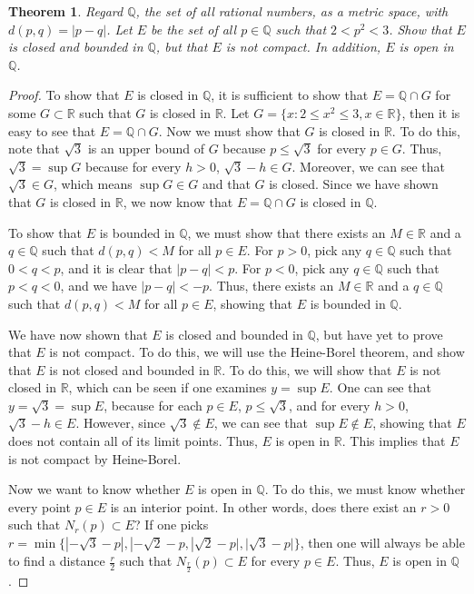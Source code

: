 \documentclass[psamsfonts]{amsart}
\newtheorem{thm}{Theorem}[section]
\theoremstyle{definition}
\theoremstyle{remark}
\numberwithin{equation}{section}
\begin{document}
\begin{thm}
Regard $\mathbb{Q}$, the set of all rational numbers, as a metric space, with $d(p,q) = |p-q|$. Let $E$ be the set of all $p \in \mathbb{Q}$ such that $2<p^2<3$. Show that $E$ is closed and bounded in $\mathbb{Q}$, but that $E$ is not compact. In addition, $E$ is open in $\mathbb{Q}$. 
\end{thm}
\begin{proof}
To show that $E$ is closed in $\mathbb{Q}$, it is sufficient to show that $E = \mathbb{Q} \cap G$ for some $G \subset \mathbb{R}$ such that $G$ is closed in $\mathbb{R}$. Let $G = \{ x : 2 \leq x^2 \leq 3, x \in \mathbb{R}\}$, then it is easy to see that $E = \mathbb{Q} \cap G$. Now we must show that $G$ is closed in $\mathbb{R}$. To do this, note that $\sqrt{3}$ is an upper bound of $G$ because $p \leq \sqrt{3}$ for every $p \in G$. Thus, $\sqrt{3} = \sup{G}$ because for every $h>0$, $\sqrt{3} - h \in G$. Moreover, we can see that $\sqrt{3} \in G$, which means $\sup{G} \in G$ and that $G$ is closed. Since we have shown that $G$ is closed in $\mathbb{R}$, we now know that $E = \mathbb{Q} \cap G$ is closed in $\mathbb{Q}$. 

To show that $E$ is bounded in $\mathbb{Q}$, we must show that there exists an $M \in \mathbb{R}$ and a $q \in \mathbb{Q}$ such that $d(p,q) < M$ for all $p \in E$. For $p>0$, pick any $q \in \mathbb{Q}$ such that $0 < q < p$, and it is clear that $|p-q| < p$. For $p<0$, pick any $q \in \mathbb{Q}$ such that $p<q<0$, and we have $|p-q| < -p$. Thus, there exists an $M \in \mathbb{R}$ and a $q \in \mathbb{Q}$ such that $d(p,q) < M$ for all $p \in E$, showing that $E$ is bounded in $\mathbb{Q}$.  

We have now shown that $E$ is closed and bounded in $\mathbb{Q}$, but have yet to prove that $E$ is not compact. To do this, we will use the Heine-Borel theorem, and show that $E$ is not closed and bounded in $\mathbb{R}$. To do this, we will show that $E$ is not closed in $\mathbb{R}$, which can be seen if one examines $y = \sup{E}$. One can see that $y = \sqrt{3} = \sup{E}$, because for each $p \in E$, $p \leq \sqrt{3}$, and for every $h>0$, $\sqrt{3} - h \in E$. However, since $\sqrt{3} \notin E$, we can see that $\sup{E} \notin E$, showing that $E$ does not contain all of its limit points. Thus, $E$ is open in $\mathbb{R}$. This implies that $E$ is not compact by Heine-Borel.

Now we want to know whether $E$ is open in $\mathbb{Q}$. To do this, we must know whether every point $p \in E$ is an interior point. In other words, does there exist an $r>0$ such that $N_r(p) \subset E$? If one picks $r = \min \{|-\sqrt{3} - p|, |-\sqrt{2}-p, |\sqrt{2}-p|,|\sqrt{3}-p|\}$, then one will always be able to find a distance $\frac{r}{2}$ such that $N_{\frac{r}{2}}(p) \subset E$ for every $p \in E$. Thus, $E$ is open in $\mathbb{Q}$. 
\end{proof}
\end{document}
